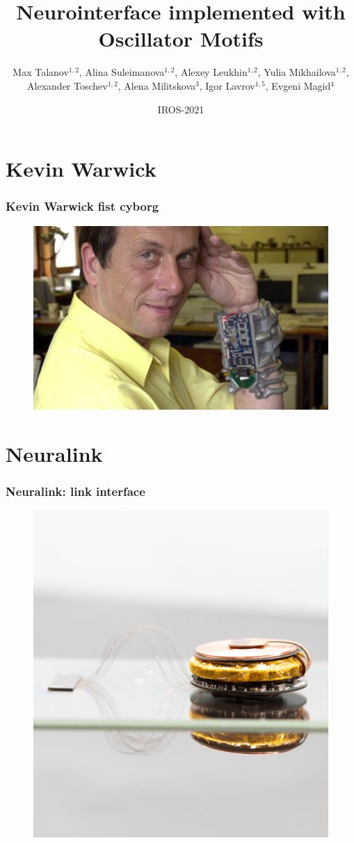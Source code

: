 \documentclass[12pt, aspectratio=169]{beamer}
\title[Neurointerface implemented with Oscillator Motifs]{Neurointerface implemented with Oscillator Motifs} %
\author[Max Talanov]{
  Max Talanov$^{1,2}$, Alina Suleimanova$^{1,2}$, Alexey Leukhin$^{1,2}$,
  Yulia Mikhailova$^{1,2}$, Alexander Toschev$^{1,2}$,
  Alena Militskova$^{3}$, Igor Lavrov$^{1,5}$, Evgeni Magid$^{4}$
}
\institute[B-Rain Labs LLC, NcN laboratory, ITIS, KFU]%
{
  $^{1}$ B-Rain Labs LLC;
  $^{2}$ Neuromorphic computing and Neurosimulations laboratory, ITIS, KFU;
  $^{3}$ Institute of Fundamental Medicine and Biology, KFU;
  $^{4}$ Intelligent Robotic Systems Laboratory (LIRS), ITIS, KFU;
  $^{5}$ Department of Neurologic Surgery, Department of Physiology and Biomedical Engineering, Department of Neurology at Mayo Clinic.
  
\medskip
\textit{max.talanov@b-rain.org}\\ %

}
\date{IROS-2021} %
\begin{document}
\begin{frame}
\titlepage %
\end{frame}



\section{Kevin Warwick}
\begin{frame}
  \frametitle{Kevin Warwick fist cyborg}
  \begin{figure}
    \includegraphics[width=0.7\linewidth]{Kevin-Warwick_2936650k}
  \end{figure}
\end{frame}


\section{Neuralink}

\begin{frame}
  \frametitle{Neuralink: link interface}
  \begin{figure}
    \includegraphics[width=0.4\linewidth]{approach-link-1}
  \end{figure}
\end{frame}
\end{document}
